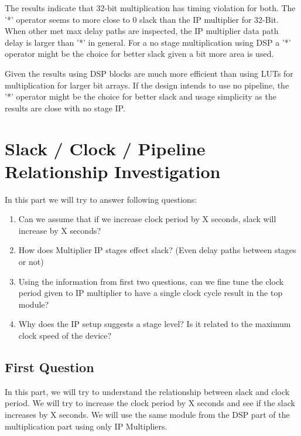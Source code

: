 \documentclass{report}
\begin{document}
The results indicate that 32-bit multiplication has timing violation for both. The '*' operator seems to more close to 0 slack than the IP multiplier for 32-Bit.
When other met max delay paths are inspected, the IP multiplier data path delay is larger than '*' in general.
For a no stage multiplication using DSP a '*' operator might be the choice for better slack given a bit more area is used.

Given the results using DSP blocks are much more efficient than using LUTs for multiplication for larger bit arrays.
If the design intends to use no pipeline, the '*' operator might be the choice for better slack and usage simplicity as the results are close with no stage IP. 

\section{Slack / Clock / Pipeline Relationship Investigation}
In this part we will try to answer following questions: 
\begin{enumerate}
    \item Can we assume that if we increase clock period by X seconds, slack will increase by X seconds?
    \item How does Multiplier IP stages effect slack? (Even delay paths between stages or not)
    \item Using the information from first two questions, can we fine tune the clock period given to IP multiplier to have a single clock cycle result in the top module?
    \item Why does the IP setup suggests a stage level? Is it related to the maximum clock speed of the device?
\end{enumerate}

\subsection{First Question}
In this part, we will try to understand the relationship between slack and clock period. We will try to increase the clock period by X seconds and see if the slack increases by X seconds.
We will use the same module from the DSP  part of the multiplication part using only IP Multipliers.
\end{document}
